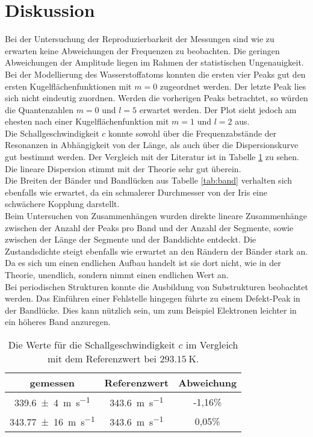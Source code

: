 
\section{Diskussion}
\label{sec:Diskussion}

Bei der Untersuchung der Reproduzierbarkeit der Messungen sind wie zu erwarten keine Abweichungen der Frequenzen zu beobachten. Die geringen Abweichungen der Amplitude liegen im Rahmen der statistischen Ungenauigkeit.\\
Bei der Modellierung des Wasserstoffatoms konnten die ersten vier Peaks gut den ersten Kugelflächenfunktionen mit $m=0$ zugeordnet werden. Der letzte Peak lies sich nicht eindeutig zuordnen. Werden die vorherigen Peaks betrachtet, so würden die Quantenzahlen $m=0$ und $l=5$ erwartet werden. Der Plot sieht jedoch am ehesten nach einer Kugelflächenfunktion mit $m=1$ und $l=2$ aus. \\
Die Schallgeschwindigkeit $c$ konnte sowohl über die Frequenzabstände der Resonanzen in Abhängigkeit von der Länge, als auch über die Dispersionskurve gut bestimmt werden. Der Vergleich mit der Literatur ist in Tabelle \ref{tab:Diskussion} zu sehen. Die lineare Dispersion stimmt mit der Theorie sehr gut überein.\\
Die Breiten der Bänder und Bandlücken aus Tabelle \ref{tab:band} verhalten sich ebenfalls wie erwartet, da ein schmalerer Durchmesser von der Iris eine schwächere Kopplung darstellt.\\
Beim Untersuchen von Zusammenhängen wurden direkte lineare Zusammenhänge zwischen der Anzahl der Peaks pro Band und der Anzahl der Segmente, sowie zwischen der Länge der Segmente und der Banddichte entdeckt. Die Zustandsdichte steigt ebenfalls wie erwartet an den Rändern der Bänder stark an. Da es sich um einen endlichen Aufbau handelt ist sie dort nicht, wie in der Theorie, unendlich, sondern nimmt einen endlichen Wert an.\\
Bei periodischen Strukturen konnte die Ausbildung von Substrukturen beobachtet werden. Das Einführen einer Fehlstelle hingegen führte zu einem Defekt-Peak in der Bandlücke. Dies kann nützlich sein, um zum Beispiel Elektronen leichter in ein höheres Band anzuregen.

\begin{table}
\centering
	\caption{Die Werte für die Schallgeschwindigkeit $c$ im Vergleich mit dem Referenzwert \cite{cLuft} bei $\SI{293,15}{\kelvin}$.}
	\label{tab:Diskussion}
	\begin{tabular}{ccc}
		\toprule
		{gemessen}&{Referenzwert\cite{cLuft}}&{Abweichung} \\
		\midrule
		\SI{339,6(4)}{\metre\per\second}   & \SI{343,6}{\metre\per\second} & -1,16\%\\
		\SI{343,77(16)}{\metre\per\second} & \SI{343,6}{\metre\per\second} & 0,05\%\\
		\bottomrule
	\end{tabular}
\end{table}